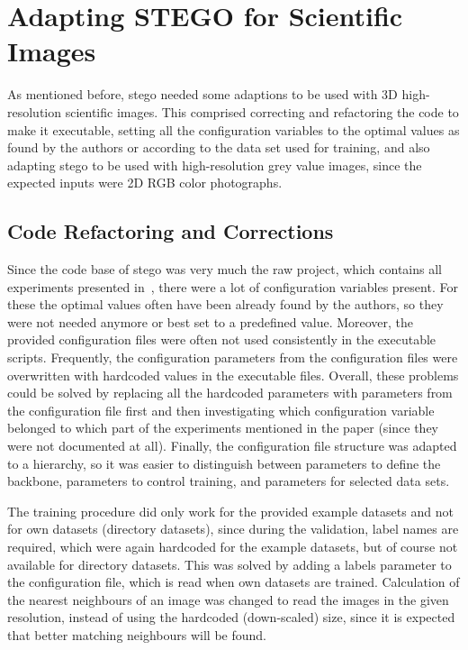 \section{Adapting STEGO for Scientific Images}\label{sec:adapting-stego}
As mentioned before, \gls{stego} needed some adaptions to be used with 3D high-resolution scientific images.
This comprised correcting and refactoring the code to make it executable, setting all the configuration variables to the optimal values as found by the authors or according to the data set used for training, and also adapting \gls{stego} to be used with high-resolution grey value images, since the expected inputs were 2D RGB color photographs.~\autocite{Hamilton2022}


\subsection{Code Refactoring and Corrections}
Since the code base of \gls{stego} was very much the raw project, which contains all experiments presented in~\autocite{Hamilton2022}, there were a lot of configuration variables present. 
For these the optimal values often have been already found by the authors, so they were not needed anymore or best set to a predefined value.
Moreover, the provided configuration files were often not used consistently in the executable scripts.
Frequently, the configuration parameters from the configuration files were overwritten with hardcoded values in the executable files.
Overall, these problems could be solved by replacing all the hardcoded parameters with parameters from the configuration file first and then investigating which configuration variable belonged to which part of the experiments mentioned in the paper (since they were not documented at all).
Finally, the configuration file structure was adapted to a hierarchy, so it was easier to distinguish between parameters to define the backbone, parameters to control training, and parameters for selected data sets.

The training procedure did only work for the provided example datasets and not for own datasets (directory datasets), since during the validation, label names are required, which were again hardcoded for the example datasets, but of course not available for directory datasets.
This was solved by adding a labels parameter to the configuration file, which is read when own datasets are trained.
Calculation of the nearest neighbours of an image was changed to read the images in the given resolution, instead of using the hardcoded (down-scaled) size, since it is expected that better matching neighbours will be found.

